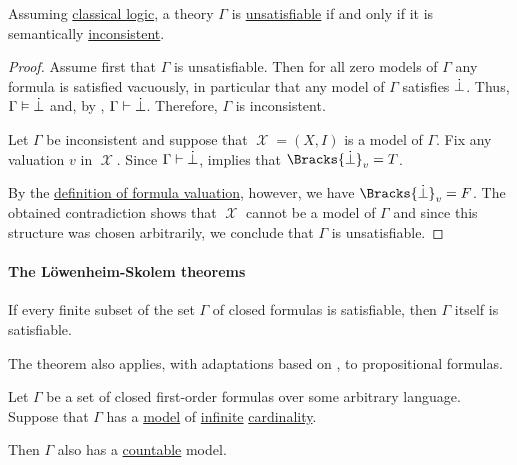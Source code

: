 \begin{proposition}\label{thm:formulas_unsatisfiable_iff_inconsistent}
   Assuming \hyperref[def:classical_logic]{classical logic}, a theory \( \Gamma \) is \hyperref[def:propositional_model]{unsatisfiable} if and only if it is semantically \hyperref[def:first_order_theory/consistent]{inconsistent}.
\end{proposition}
\begin{proof}
  \SufficiencySubProof Assume first that \( \Gamma \) is unsatisfiable. Then for all zero models of \( \Gamma \) any formula is satisfied vacuously, in particular that any model of \( \Gamma \) satisfies \( \dot\bot \). Thus, \( \Gamma \vDash \dot\bot \) and, by , \( \Gamma \vdash \dot\bot \). Therefore, \( \Gamma \) is inconsistent.

  \NecessitySubProof Let \( \Gamma \) be inconsistent and suppose that \( \mscrX = (X, I) \) is a model of \( \Gamma \). Fix any valuation \( v \) in \( \mscrX \). Since \( \Gamma \vdash \dot\bot \),  implies that \( \Bracks{\synbot}_v = T \).

  By the \hyperref[def:first_order_valuation/formula_valuation]{definition of formula valuation}, however, we have \( \Bracks{\synbot}_v = F \). The obtained contradiction shows that \( \mscrX \) cannot be a model of \( \Gamma \) and since this structure was chosen arbitrarily, we conclude that \( \Gamma \) is unsatisfiable.
\end{proof}

\paragraph{The L\"owenheim-Skolem theorems}

\begin{theorem}\label{thm:first_order_compactness_theorem}
  If every finite subset of the set \( \Gamma \) of closed formulas is satisfiable, then \( \Gamma \) itself is satisfiable.
\end{theorem}
\begin{comments}
  \item The theorem also applies, with adaptations based on , to propositional formulas.
\end{comments}

\begin{theorem}\label{thm:downward_lowenheim_skolem_theorem}
  Let \( \Gamma \) be a set of closed first-order formulas over some arbitrary language. Suppose that \( \Gamma \) has a \hyperref[def:first_order_model]{model} of \hyperref[def:set_finiteness]{infinite} \hyperref[thm:cardinality_existence]{cardinality}.

  Then \( \Gamma \) also has a \hyperref[def:set_countability]{countable} model.
\end{theorem}

